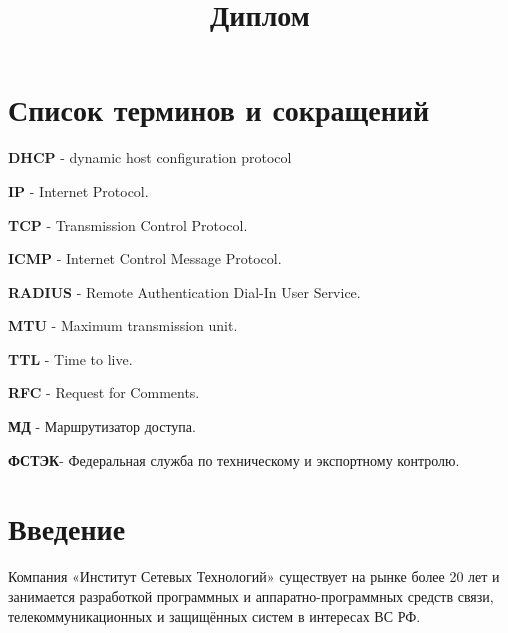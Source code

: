 \documentclass[14pt,a4paper]{extarticle}
\title{Диплом}
\begin{document}
\setcounter{page}{7}

\pagebreak
\tableofcontents

\pagebreak
\section*{Список терминов и сокращений}

\textbf{DHCP} - dynamic host configuration protocol

\textbf{IP} - Internet Protocol.

\textbf{TCP} - Transmission Control Protocol.

\textbf{ICMP} - Internet Control Message Protocol.

\textbf{RADIUS} - Remote Authentication Dial-In User Service.

\textbf{MTU} - Maximum transmission unit.

\textbf{TTL} - Time to live.

\textbf{RFC} - Request for Comments.

\textbf{МД} - Маршрутизатор доступа.

\textbf{ФСТЭК}- Федеральная служба по техническому и экспортному контролю.


\pagebreak
\section*{Введение}


Компания «Институт Сетевых Технологий» существует на рынке более 20 лет и
занимается разработкой программных и аппаратно-программных средств связи,  телекоммуникационных и защищённых систем в интересах ВС РФ.
\end{document}
